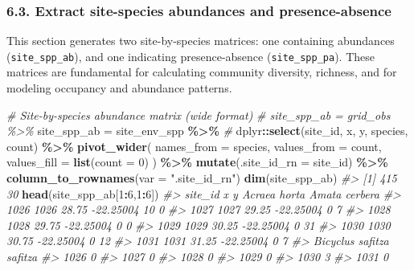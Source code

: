 \documentclass[
]{article}
\newenvironment{Shaded}{\begin{snugshade}}{\end{snugshade}}
\newcommand{\AttributeTok}[1]{\textcolor[rgb]{0.13,0.29,0.53}{#1}}
\newcommand{\CommentTok}[1]{\textcolor[rgb]{0.56,0.35,0.01}{\textit{#1}}}
\newcommand{\DecValTok}[1]{\textcolor[rgb]{0.00,0.00,0.81}{#1}}
\newcommand{\FunctionTok}[1]{\textcolor[rgb]{0.13,0.29,0.53}{\textbf{#1}}}
\newcommand{\NormalTok}[1]{#1}
\newcommand{\OtherTok}[1]{\textcolor[rgb]{0.56,0.35,0.01}{#1}}
\newcommand{\SpecialCharTok}[1]{\textcolor[rgb]{0.81,0.36,0.00}{\textbf{#1}}}
\newcommand{\StringTok}[1]{\textcolor[rgb]{0.31,0.60,0.02}{#1}}
\begin{document}
\hypertarget{extract-site-species-abundances-and-presence-absence}{%
\subsubsection{\texorpdfstring{6.3. Extract \textbf{site-species}
abundances and
presence-absence}{6.3. Extract site-species abundances and presence-absence}}\label{extract-site-species-abundances-and-presence-absence}}

This section generates two site-by-species matrices: one containing
abundances (\texttt{site\_spp\_ab}), and one indicating presence-absence
(\texttt{site\_spp\_pa}). These matrices are fundamental for calculating
community diversity, richness, and for modeling occupancy and abundance
patterns.

\begin{Shaded}
\begin{Highlighting}[]
\CommentTok{\# Site{-}by{-}species abundance matrix (wide format)}
\CommentTok{\# site\_spp\_ab = grid\_obs \%\textgreater{}\%}
\NormalTok{site\_spp\_ab }\OtherTok{=}\NormalTok{ site\_env\_spp }\SpecialCharTok{\%\textgreater{}\%} \CommentTok{\# }
\NormalTok{  dplyr}\SpecialCharTok{::}\FunctionTok{select}\NormalTok{(site\_id, x, y, species, count) }\SpecialCharTok{\%\textgreater{}\%}
  \FunctionTok{pivot\_wider}\NormalTok{(}
    \AttributeTok{names\_from  =}\NormalTok{ species,}
    \AttributeTok{values\_from =}\NormalTok{ count,}
    \AttributeTok{values\_fill =} \FunctionTok{list}\NormalTok{(}\AttributeTok{count =} \DecValTok{0}\NormalTok{)}
\NormalTok{  ) }\SpecialCharTok{\%\textgreater{}\%}
  \FunctionTok{mutate}\NormalTok{(}\AttributeTok{.site\_id\_rn =}\NormalTok{ site\_id) }\SpecialCharTok{\%\textgreater{}\%}
  \FunctionTok{column\_to\_rownames}\NormalTok{(}\AttributeTok{var =} \StringTok{".site\_id\_rn"}\NormalTok{)}
\FunctionTok{dim}\NormalTok{(site\_spp\_ab)}
\CommentTok{\#\textgreater{} [1] 415  30}
\FunctionTok{head}\NormalTok{(site\_spp\_ab[}\DecValTok{1}\SpecialCharTok{:}\DecValTok{6}\NormalTok{,}\DecValTok{1}\SpecialCharTok{:}\DecValTok{6}\NormalTok{])}
\CommentTok{\#\textgreater{}      site\_id     x         y Acraea horta Amata cerbera}
\CommentTok{\#\textgreater{} 1026    1026 28.75 {-}22.25004           10             0}
\CommentTok{\#\textgreater{} 1027    1027 29.25 {-}22.25004            0             7}
\CommentTok{\#\textgreater{} 1028    1028 29.75 {-}22.25004            0             0}
\CommentTok{\#\textgreater{} 1029    1029 30.25 {-}22.25004            0            31}
\CommentTok{\#\textgreater{} 1030    1030 30.75 {-}22.25004            0            12}
\CommentTok{\#\textgreater{} 1031    1031 31.25 {-}22.25004            0             7}
\CommentTok{\#\textgreater{}      Bicyclus safitza safitza}
\CommentTok{\#\textgreater{} 1026                        0}
\CommentTok{\#\textgreater{} 1027                        0}
\CommentTok{\#\textgreater{} 1028                        0}
\CommentTok{\#\textgreater{} 1029                        0}
\CommentTok{\#\textgreater{} 1030                        3}
\CommentTok{\#\textgreater{} 1031                        0}


\end{Highlighting}
\end{Shaded}
\end{document}
